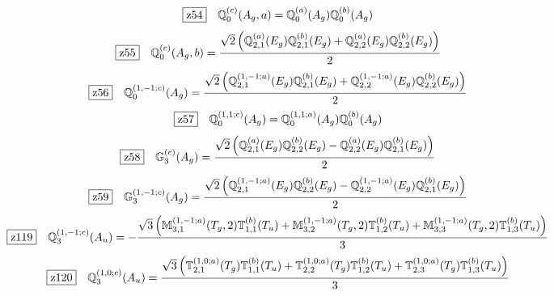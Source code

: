 \documentclass[fleqn,10pt,landscape]{jsarticle}
\begin{document}
\begin{dmath*}
\hspace*{3mm}\fbox{z54}\quad \mathbb{Q}_{0}^{(c)}(A_{g},a)=\mathbb{Q}_{0}^{(a)}(A_{g}) \mathbb{Q}_{0}^{(b)}(A_{g})
\end{dmath*}
\begin{dmath*}
\hspace*{3mm}\fbox{z55}\quad \mathbb{Q}_{0}^{(c)}(A_{g},b)=\frac{\sqrt{2} \left(\mathbb{Q}_{2,1}^{(a)}(E_{g}) \mathbb{Q}_{2,1}^{(b)}(E_{g}) + \mathbb{Q}_{2,2}^{(a)}(E_{g}) \mathbb{Q}_{2,2}^{(b)}(E_{g})\right)}{2}
\end{dmath*}
\begin{dmath*}
\hspace*{3mm}\fbox{z56}\quad \mathbb{Q}_{0}^{(1,-1;c)}(A_{g})=\frac{\sqrt{2} \left(\mathbb{Q}_{2,1}^{(1,-1;a)}(E_{g}) \mathbb{Q}_{2,1}^{(b)}(E_{g}) + \mathbb{Q}_{2,2}^{(1,-1;a)}(E_{g}) \mathbb{Q}_{2,2}^{(b)}(E_{g})\right)}{2}
\end{dmath*}
\begin{dmath*}
\hspace*{3mm}\fbox{z57}\quad \mathbb{Q}_{0}^{(1,1;c)}(A_{g})=\mathbb{Q}_{0}^{(1,1;a)}(A_{g}) \mathbb{Q}_{0}^{(b)}(A_{g})
\end{dmath*}
\begin{dmath*}
\hspace*{3mm}\fbox{z58}\quad \mathbb{G}_{3}^{(c)}(A_{g})=\frac{\sqrt{2} \left(\mathbb{Q}_{2,1}^{(a)}(E_{g}) \mathbb{Q}_{2,2}^{(b)}(E_{g}) - \mathbb{Q}_{2,2}^{(a)}(E_{g}) \mathbb{Q}_{2,1}^{(b)}(E_{g})\right)}{2}
\end{dmath*}
\begin{dmath*}
\hspace*{3mm}\fbox{z59}\quad \mathbb{G}_{3}^{(1,-1;c)}(A_{g})=\frac{\sqrt{2} \left(\mathbb{Q}_{2,1}^{(1,-1;a)}(E_{g}) \mathbb{Q}_{2,2}^{(b)}(E_{g}) - \mathbb{Q}_{2,2}^{(1,-1;a)}(E_{g}) \mathbb{Q}_{2,1}^{(b)}(E_{g})\right)}{2}
\end{dmath*}
\begin{dmath*}
\hspace*{3mm}\fbox{z119}\quad \mathbb{Q}_{3}^{(1,-1;c)}(A_{u})=- \frac{\sqrt{3} \left(\mathbb{M}_{3,1}^{(1,-1;a)}(T_{g},2) \mathbb{T}_{1,1}^{(b)}(T_{u}) + \mathbb{M}_{3,2}^{(1,-1;a)}(T_{g},2) \mathbb{T}_{1,2}^{(b)}(T_{u}) + \mathbb{M}_{3,3}^{(1,-1;a)}(T_{g},2) \mathbb{T}_{1,3}^{(b)}(T_{u})\right)}{3}
\end{dmath*}
\begin{dmath*}
\hspace*{3mm}\fbox{z120}\quad \mathbb{Q}_{3}^{(1,0;c)}(A_{u})=\frac{\sqrt{3} \left(\mathbb{T}_{2,1}^{(1,0;a)}(T_{g}) \mathbb{T}_{1,1}^{(b)}(T_{u}) + \mathbb{T}_{2,2}^{(1,0;a)}(T_{g}) \mathbb{T}_{1,2}^{(b)}(T_{u}) + \mathbb{T}_{2,3}^{(1,0;a)}(T_{g}) \mathbb{T}_{1,3}^{(b)}(T_{u})\right)}{3}
\end{dmath*}
\end{document}
